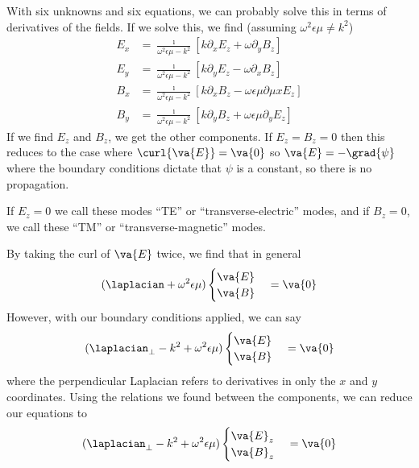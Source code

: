 \documentclass[a4paper,twoside,master.tex]{subfiles}
\begin{document}
With six unknowns and six equations, we can probably solve this in terms of derivatives of the fields. If we solve this, we find (assuming $ \omega^2 \epsilon \mu \neq k^2 $)
\begin{align}
    E_x &= \frac{\imath}{\omega^2 \epsilon \mu - k^2} [ k \partial_x E_z + \omega \partial_y B_z] \\
    E_y &= \frac{\imath}{\omega^2 \epsilon \mu - k^2} [k \partial_y E_z - \omega \partial_x B_z] \\
    B_x &= \frac{\imath}{\omega^2 \epsilon \mu - k^2} [k \partial_x B_z - \omega \epsilon \mu \partial \mu x E_z] \\
    B_y &= \frac{\imath}{\omega^2 \epsilon \mu - k^2} [k \partial_y B_z + \omega \epsilon \mu \partial_y E_z]
\end{align}
If we find $ E_z $ and $ B_z $, we get the other components. If $ E_z = B_z = 0 $ then this reduces to the case where $ \curl{ \va{E}} = \va{0} $ so $ \va{E} = - \grad{\psi} $ where the boundary conditions dictate that $ \psi $ is a constant, so there is no propagation.

If $ E_z = 0 $ we call these modes ``TE'' or ``transverse-electric'' modes, and if $ B_z = 0 $, we call these ``TM'' or ``transverse-magnetic'' modes.

By taking the curl of $ \va{E} $ twice, we find that in general
\begin{equation}
    (\laplacian + \omega^2 \epsilon \mu) \begin{cases} \va{E} \\ \va{B} \end{cases} = \va{0}
\end{equation}
However, with our boundary conditions applied, we can say
\begin{equation}
    (\laplacian_{\perp} - k^2 + \omega^2 \epsilon \mu) \begin{cases} \va{E} \\ \va{B} \end{cases} = \va{0}
\end{equation}
where the perpendicular Laplacian refers to derivatives in only the $ x $ and $ y $ coordinates. Using the relations we found between the components, we can reduce our equations to
\begin{equation}
    (\laplacian_{\perp} - k^2 + \omega^2 \epsilon \mu) \begin{cases} \va{E}_z \\ \va{B}_z \end{cases} = \va{0}
\end{equation}
\end{document}
